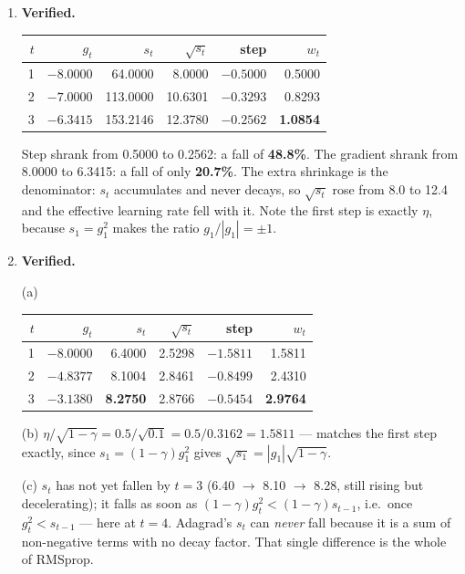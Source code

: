 \documentclass[11pt,a4paper]{article}
\newcommand{\A}[1]{\item[\textbf{#1}]}
\begin{document}
\begin{enumerate}[leftmargin=1.9cm]
\A{U3.31} \textbf{Verified.}
\begin{answerbox}
\begin{center}\begin{tabular}{@{}rrrrrr@{}}\toprule
$t$ & $g_t$ & $s_t$ & $\sqrt{s_t}$ & step & $w_t$\\
\midrule
1 & $-8.0000$ & 64.0000 & 8.0000 & $-0.5000$ & 0.5000\\
2 & $-7.0000$ & 113.0000 & 10.6301 & $-0.3293$ & 0.8293\\
3 & $-6.3415$ & 153.2146 & 12.3780 & $-0.2562$ & \textbf{1.0854}\\
\bottomrule\end{tabular}\end{center}
Step shrank from 0.5000 to 0.2562: a fall of \textbf{48.8\%}. The gradient
shrank from 8.0000 to 6.3415: a fall of only \textbf{20.7\%}. The extra
shrinkage is the denominator: $s_t$ accumulates and never decays, so
$\sqrt{s_t}$ rose from 8.0 to 12.4 and the effective learning rate fell with
it. Note the first step is exactly $\eta$, because $s_1 = g_1^2$ makes the
ratio $g_1/|g_1| = \pm 1$.
\end{answerbox}

\A{U3.32} \textbf{Verified.}
\begin{answerbox}
(a) \begin{center}\begin{tabular}{@{}rrrrrr@{}}\toprule
$t$ & $g_t$ & $s_t$ & $\sqrt{s_t}$ & step & $w_t$\\
\midrule
1 & $-8.0000$ & 6.4000 & 2.5298 & $-1.5811$ & 1.5811\\
2 & $-4.8377$ & 8.1004 & 2.8461 & $-0.8499$ & 2.4310\\
3 & $-3.1380$ & \textbf{8.2750} & 2.8766 & $-0.5454$ & \textbf{2.9764}\\
\bottomrule\end{tabular}\end{center}

(b) $\eta/\sqrt{1-\gamma} = 0.5/\sqrt{0.1} = 0.5/0.3162 = \mathbf{1.5811}$ ---
matches the first step exactly, since $s_1 = (1-\gamma)g_1^2$ gives
$\sqrt{s_1} = |g_1|\sqrt{1-\gamma}$.

(c) $s_t$ has not yet fallen by $t=3$ (6.40 $\to$ 8.10 $\to$ 8.28, still
rising but decelerating); it falls as soon as $(1-\gamma)g_t^2 < (1-\gamma)s_{t-1}$,
i.e.\ once $g_t^2 < s_{t-1}$ --- here at $t = 4$. Adagrad's $s_t$ can
\emph{never} fall because it is a sum of non-negative terms with no decay
factor. That single difference is the whole of RMSprop.
\end{answerbox}


\end{enumerate}
\end{document}
